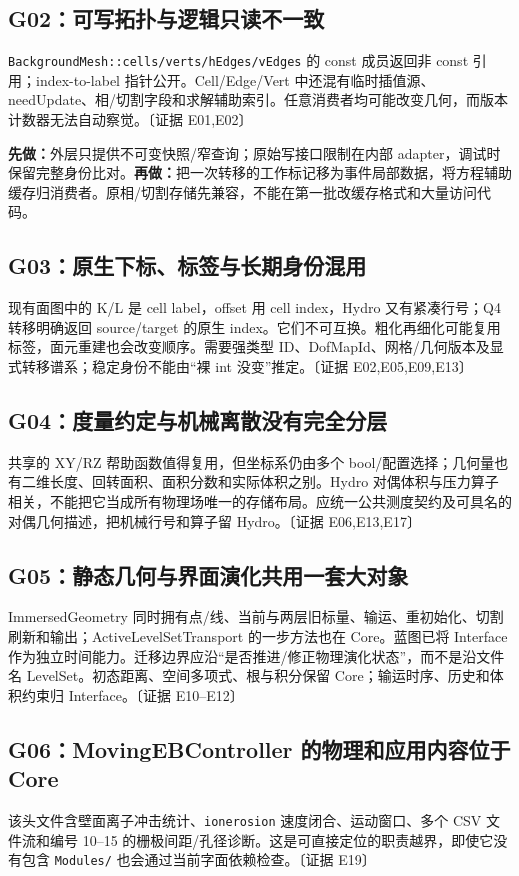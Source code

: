 \documentclass[UTF8,a4paper,11pt,fontset=fandol]{ctexart}
\newcommand{\code}[1]{\nolinkurl{#1}}
\newcommand{\ev}[1]{{\small\color{muted}〔证据 #1〕}}
\begin{document}
\subsection{G02：可写拓扑与逻辑只读不一致}
\code{BackgroundMesh::cells/verts/hEdges/vEdges} 的 const 成员返回非 const 引用；index-to-label 指针公开。Cell/Edge/Vert 中还混有临时插值源、needUpdate、相/切割字段和求解辅助索引。任意消费者均可能改变几何，而版本计数器无法自动察觉。\ev{E01,E02}

\textbf{先做：}外层只提供不可变快照/窄查询；原始写接口限制在内部 adapter，调试时保留完整身份比对。\textbf{再做：}把一次转移的工作标记移为事件局部数据，将方程辅助缓存归消费者。原相/切割存储先兼容，不能在第一批改缓存格式和大量访问代码。

\subsection{G03：原生下标、标签与长期身份混用}
现有面图中的 K/L 是 cell label，offset 用 cell index，Hydro 又有紧凑行号；Q4 转移明确返回 source/target 的原生 index。它们不可互换。粗化再细化可能复用标签，面元重建也会改变顺序。需要强类型 ID、DofMapId、网格/几何版本及显式转移谱系；稳定身份不能由“裸 int 没变”推定。\ev{E02,E05,E09,E13}

\subsection{G04：度量约定与机械离散没有完全分层}
共享的 XY/RZ 帮助函数值得复用，但坐标系仍由多个 bool/配置选择；几何量也有二维长度、回转面积、面积分数和实际体积之别。Hydro 对偶体积与压力算子相关，不能把它当成所有物理场唯一的存储布局。应统一公共测度契约及可具名的对偶几何描述，把机械行号和算子留 Hydro。\ev{E06,E13,E17}

\subsection{G05：静态几何与界面演化共用一套大对象}
ImmersedGeometry 同时拥有点/线、当前与两层旧标量、输运、重初始化、切割刷新和输出；ActiveLevelSetTransport 的一步方法也在 Core。蓝图已将 Interface 作为独立时间能力。迁移边界应沿“是否推进/修正物理演化状态”，而不是沿文件名 LevelSet。初态距离、空间多项式、根与积分保留 Core；输运时序、历史和体积约束归 Interface。\ev{E10--E12}

\subsection{G06：MovingEBController 的物理和应用内容位于 Core}
该头文件含壁面离子冲击统计、\code{ionerosion} 速度闭合、运动窗口、多个 CSV 文件流和编号 10--15 的栅极间距/孔径诊断。这是可直接定位的职责越界，即使它没有包含 \code{Modules/} 也会通过当前字面依赖检查。\ev{E19}
\end{document}
